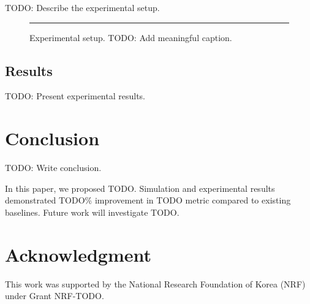 \documentclass[journal]{IEEEtran}
\begin{document}
TODO: Describe the experimental setup.

\begin{figure}[htbp]
  \centering
  \rule{\columnwidth}{0.4pt}
  \vspace{1em}
  \caption{Experimental setup. TODO: Add meaningful caption.}
  \label{fig:exp_setup}
\end{figure}

\subsection{Results}

TODO: Present experimental results.




\section{Conclusion}
\label{sec:conclusion}

TODO: Write conclusion.

In this paper, we proposed TODO.
Simulation and experimental results demonstrated TODO\% improvement
in TODO metric compared to existing baselines.
Future work will investigate TODO.


\section*{Acknowledgment}
This work was supported by the National Research Foundation of Korea (NRF)
under Grant NRF-TODO.
\end{document}

